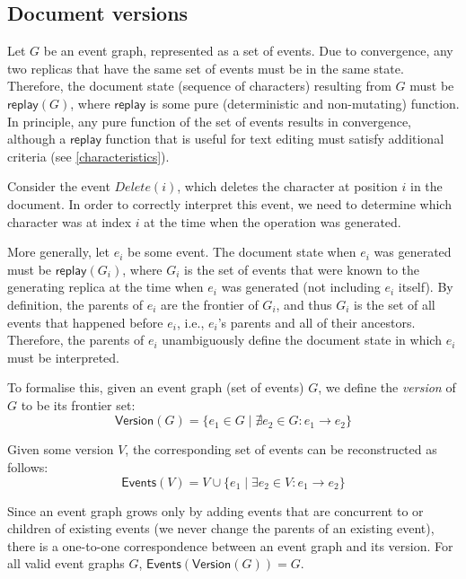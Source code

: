 \documentclass[sigplan,10pt]{acmart}
\begin{document}
\subsection{Document versions}\label{versions}

Let $G$ be an event graph, represented as a set of events.
Due to convergence, any two replicas that have the same set of events must be in the same state.
Therefore, the document state (sequence of characters) resulting from $G$ must be $\mathsf{replay}(G)$, where $\mathsf{replay}$ is some pure (deterministic and non-mutating) function.
In principle, any pure function of the set of events results in convergence, although a $\mathsf{replay}$ function that is useful for text editing must satisfy additional criteria (see \autoref{characteristics}).

Consider the event $\mathit{Delete}(i)$, which deletes the character at position $i$ in the document. In order to correctly interpret this event, we need to determine which character was at index $i$ at the time when the operation was generated.

More generally, let $e_i$ be some event. The document state when $e_i$ was generated must be $\mathsf{replay}(G_i)$, where $G_i$ is the set of events that were known to the generating replica at the time when $e_i$ was generated (not including $e_i$ itself).
By definition, the parents of $e_i$ are the frontier of $G_i$, and thus $G_i$ is the set of all events that happened before $e_i$, i.e., $e_i$'s parents and all of their ancestors.
Therefore, the parents of $e_i$ unambiguously define the document state in which $e_i$ must be interpreted.

To formalise this, given an event graph (set of events) $G$, we define the \emph{version} of $G$ to be its frontier set:
\begin{equation*}
  \mathsf{Version}(G) = \{e_1 \in G \mid \nexists e_2 \in G: e_1 \rightarrow e_2\}
\end{equation*}

Given some version $V$, the corresponding set of events can be reconstructed as follows:
\begin{equation*}
  \mathsf{Events}(V) = V \cup \{e_1 \mid \exists e_2 \in V : e_1 \rightarrow e_2\}
\end{equation*}

Since an event graph grows only by adding events that are concurrent to or children of existing events (we never change the parents of an existing event), there is a one-to-one correspondence between an event graph and its version.
For all valid event graphs $G$, $\mathsf{Events}(\mathsf{Version}(G)) = G$.
\end{document}
